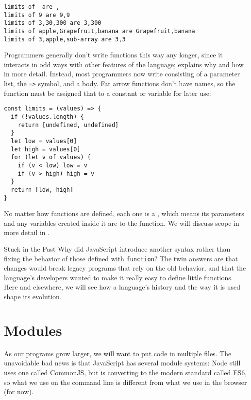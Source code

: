 \begin{verbatim}
limits of  are ,
limits of 9 are 9,9
limits of 3,30,300 are 3,300
limits of apple,Grapefruit,banana are Grapefruit,banana
limits of 3,apple,sub-array are 3,3
\end{verbatim}

Programmers generally don't write functions this way any longer,
since it interacts in odd ways with other features of the language;
 explains why and how in more detail.
Instead,
most programmers now write 
consisting of a parameter list,
the \texttt{=\textgreater{}} symbol,
and a body.
Fat arrow functions don't have names,
so the function must be assigned that to a constant or variable for later use:

\begin{verbatim}
const limits = (values) => {
  if (!values.length) {
    return [undefined, undefined]
  }
  let low = values[0]
  let high = values[0]
  for (let v of values) {
    if (v < low) low = v
    if (v > high) high = v
  }
  return [low, high]
}
\end{verbatim}

No matter how functions are defined,
each one is a ,
which means its parameters and any variables created inside it are  to the function.
We will discuss scope in more detail in .

\begin{aside}{Stuck in the Past}
  Why did JavaScript introduce another syntax
  rather than fixing the behavior of those defined with \texttt{function}?
  The twin answers are that changes would break legacy programs that rely on the old behavior,
  and that the language's developers wanted to make it really easy to define little functions.
  Here and elsewhere,
  we will see how a language's history and the way it is used shape its evolution.
\end{aside}

\section{Modules}\label{s:basics-modules}

As our programs grow larger,
we will want to put code in multiple files.
The unavoidable bad news is that JavaScript has several module systems:
Node still uses one called CommonJS,
but is converting to the modern standard called ES6,
so what we use on the command line is different from what we use in the browser (for now).


